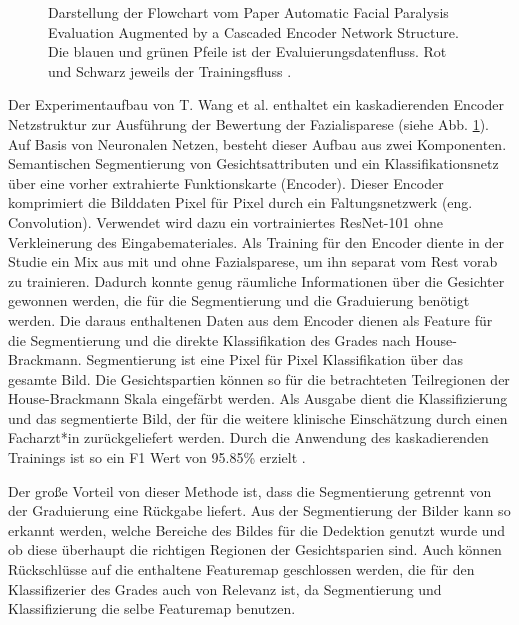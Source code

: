 \begin{figure}[!b]
{
}%
\caption[Darstellung der Flowchart vom Paper Automatic Facial Paralysis Evaluation Augmented by a Cascaded Encoder Network Structure]{Darstellung der Flowchart vom Paper Automatic Facial Paralysis Evaluation Augmented by a Cascaded Encoder Network Structure. Die blauen und grünen Pfeile ist der Evaluierungsdatenfluss. Rot und Schwarz jeweils der Trainingsfluss \cite{detection_fp2}.}\label{cap:paper_1}
\end{figure}\label{fig:paper_1}

Der Experimentaufbau von T. Wang et al. enthaltet ein kaskadierenden Encoder Netzstruktur zur Ausführung der Bewertung der Fazialisparese (siehe Abb. \ref{cap:paper_1}). Auf Basis von Neuronalen Netzen, besteht dieser Aufbau aus zwei Komponenten. Semantischen Segmentierung von Gesichtsattributen und ein Klassifikationsnetz über eine vorher extrahierte Funktionskarte (Encoder). Dieser Encoder komprimiert die Bilddaten Pixel für Pixel durch ein Faltungsnetzwerk (eng. Convolution). Verwendet wird dazu ein vortrainiertes ResNet-101 ohne Verkleinerung des Eingabemateriales. Als Training für den Encoder diente in der Studie ein Mix aus mit und ohne Fazialsparese, um ihn separat vom Rest vorab zu trainieren. Dadurch konnte genug räumliche Informationen über die Gesichter gewonnen werden, die für die Segmentierung und die Graduierung benötigt werden. Die daraus enthaltenen Daten aus dem Encoder dienen als Feature für die Segmentierung und die direkte Klassifikation des Grades nach House-Brackmann. Segmentierung ist eine Pixel für Pixel Klassifikation über das gesamte Bild. Die Gesichtspartien können so für die betrachteten Teilregionen der House-Brackmann Skala eingefärbt werden. Als Ausgabe dient die Klassifizierung und das segmentierte Bild, der für die weitere klinische Einschätzung durch einen Facharzt*in zurückgeliefert werden. Durch die Anwendung des kaskadierenden Trainings ist so ein F1 Wert von 95.85\% erzielt \cite{detection_fp2}.

Der große Vorteil von dieser Methode ist, dass die Segmentierung getrennt von der Graduierung eine Rückgabe liefert. Aus der Segmentierung der Bilder kann so erkannt werden, welche Bereiche des Bildes für die Dedektion genutzt wurde und ob diese überhaupt die richtigen Regionen der Gesichtsparien sind. Auch können Rückschlüsse auf die enthaltene Featuremap geschlossen werden, die für den Klassifizerier des Grades auch von Relevanz ist, da Segmentierung und Klassifizierung die selbe Featuremap benutzen.



